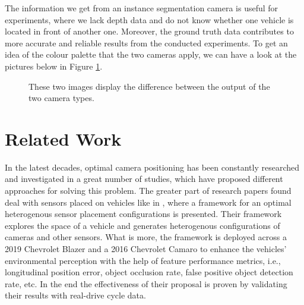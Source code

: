 The information we get from an instance segmentation camera is useful for experiments, where we lack depth data and do not know whether one vehicle is located in front of another one. Moreover, the ground truth data contributes to more accurate and reliable results from the conducted experiments. To get an idea of the colour palette that the two cameras apply, we can have a look at the pictures below in Figure \ref{fig:camera_outputs}. 

\begin{figure} [h!]
  \centering
  \hfill
  \caption[CARLA's cameras]{These two images display the difference between the output of the two camera types.} \label{fig:camera_outputs}
\end{figure}
\newpage
\section{Related Work} \label{related_work}
In the latest decades, optimal camera positioning has been constantly researched and investigated in a great number of studies, which have proposed different approaches for solving this problem. The greater part of research papers found deal with sensors placed on vehicles like in \cite{onboard_sensor_placement}, where a framework for an optimal heterogenous sensor placement configurations is presented. Their framework explores the space of a vehicle and generates heterogenous configurations of cameras and other sensors. What is more, the framework is deployed across a 2019 Chevrolet Blazer and a 2016 Chevrolet Camaro to enhance the vehicles' environmental perception with the help of feature performance metrics, i.e., longitudinal position error, object occlusion rate, false positive object detection rate, etc. In the end the effectiveness of their proposal is proven by validating their results with real-drive cycle data. 

